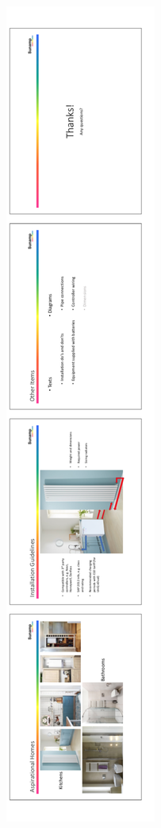\begin{figure}[htbp]
\begin{subfigure}{.18\textwidth}
		\includegraphics[height=.8\textheight]{Appendices/Sunamp_Presentation_16spp_03.png}
	\end{subfigure}
\end{figure}